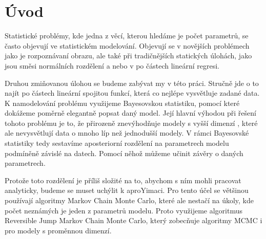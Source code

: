 \documentclass[czech,master,public,dept470,male,cpdeclaration,oneside, python]{diploma}
\begin{document}
\MakeTitlePages
\lstlistoflistings

\section{Úvod}
Statistické problémy, kde jedna z věcí, kterou hledáme je počet parametrů, se často objevují ve statistickém modelování. Objevují se v novějších problémech jako je rozpoznávaní obrazu, ale také při tradičnějších statických úlohách, jako jsou směsi normálních rozdělení a nebo v po částech lineární regresi. \par
Druhou zmiňovanou úlohou se budeme zabývat my v této práci. Stručně jde o to najít po částech lineární spojitou funkcí, která co nejlépe vysvětluje zadané data. K namodelování problému využijeme Bayesovskou statistiku, pomocí které dokážeme poměrně elegantně popsat daný model. Její hlavní výhodou při řešení tohoto problému je to, že přirozeně znevýhodňuje modely s vyšší dimenzí \cite{robert2007bayesian}, které ale nevysvětlují data o mnoho líp než jednodušší modely. V rámci Bayesovské statistiky tedy sestavíme aposteriorní rozdělení na parametrech modelu podmíněně závislé na datech. Pomocí něhož můžeme učinit závěry o daných parametrech. \par
Protože toto rozdělení je příliš složité na to, abychom s ním mohli pracovat analyticky, budeme se muset uchýlit k aproYimaci. Pro tento účel se většinou používají algoritmy Markov Chain Monte Carlo, které ale nestačí na úkoly, kde počet neznámých je jeden z parametrů modelu.  Proto využijeme algoritmus Reversible Jump Markov Chain Monte Carlo, který zobecňuje algoritmy MCMC i pro modely s proměnnou dimenzí.
\end{document}
